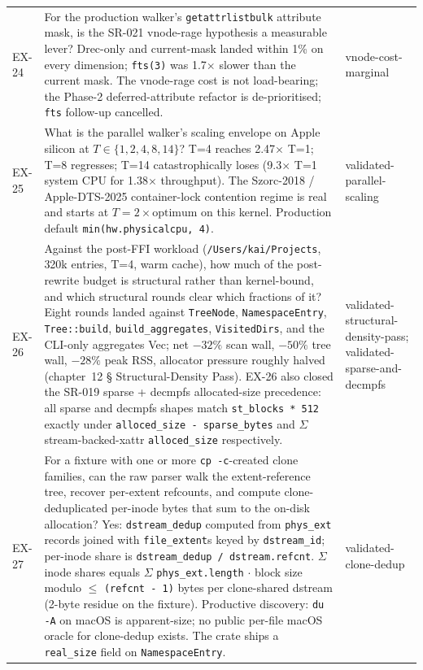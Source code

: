 \begin{longtable}{p{}p{}p{}}
EX-24 &
For the production walker's \texttt{getattrlistbulk} attribute
mask, is the SR-021 vnode-rage hypothesis a measurable lever?
Drec-only and current-mask landed within 1\% on every dimension;
\texttt{fts(3)} was 1.7$\times$ slower than the current mask. The
vnode-rage cost is not load-bearing; the Phase-2 deferred-attribute
refactor is de-prioritised; \texttt{fts} follow-up cancelled.
& vnode-cost-marginal \\

EX-25 &
What is the parallel walker's scaling envelope on Apple silicon at
$T \in \{1, 2, 4, 8, 14\}$? T=4 reaches 2.47$\times$ T=1; T=8
regresses; T=14 catastrophically loses (9.3$\times$ T=1 system CPU
for 1.38$\times$ throughput). The Szorc-2018 / Apple-DTS-2025
container-lock contention regime is real and starts at $T = 2 \times
\text{optimum}$ on this kernel. Production default
\texttt{min(hw.physicalcpu, 4)}.
& validated-parallel-scaling \\

EX-26 &
Against the post-FFI workload (\texttt{/Users/kai/Projects},
320k entries, T=4, warm cache), how much of the post-rewrite
budget is structural rather than kernel-bound, and which
structural rounds clear which fractions of it? Eight rounds
landed against \texttt{TreeNode}, \texttt{NamespaceEntry},
\texttt{Tree::build}, \texttt{build\_aggregates},
\texttt{VisitedDirs}, and the CLI-only aggregates Vec; net
$-32\%$ scan wall, $-50\%$ tree wall, $-28\%$ peak RSS,
allocator pressure roughly halved (chapter~12 §
Structural-Density Pass). EX-26 also closed the SR-019 sparse
+ decmpfs allocated-size precedence: all sparse and decmpfs
shapes match \texttt{st\_blocks * 512} exactly under
\texttt{alloced\_size - sparse\_bytes} and
$\Sigma$ stream-backed-xattr \texttt{alloced\_size}
respectively.
& validated-structural-density-pass; validated-sparse-and-decmpfs \\

EX-27 &
For a fixture with one or more \texttt{cp -c}-created clone
families, can the raw parser walk the extent-reference tree,
recover per-extent refcounts, and compute clone-deduplicated
per-inode bytes that sum to the on-disk allocation? Yes:
\texttt{dstream\_dedup} computed from \texttt{phys\_ext}
records joined with \texttt{file\_extent}s keyed by
\texttt{dstream\_id}; per-inode share is
\texttt{dstream\_dedup / dstream.refcnt}.
$\Sigma$ inode shares equals
$\Sigma$ \texttt{phys\_ext.length} $\cdot$ block size modulo
$\leq$ \texttt{(refcnt - 1)} bytes per clone-shared dstream
(2-byte residue on the fixture). Productive discovery:
\texttt{du -A} on macOS is apparent-size; no public per-file
macOS oracle for clone-dedup exists. The crate ships a
\texttt{real\_size} field on \texttt{NamespaceEntry}.
& validated-clone-dedup \\


\end{longtable}
